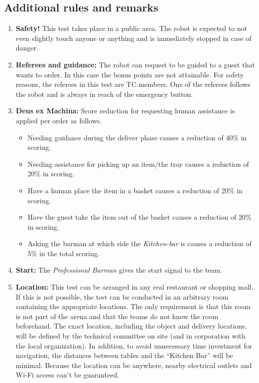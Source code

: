 \subsection{Additional rules and remarks}
\begin{enumerate}[nosep]
	\item \textbf{Safety!} This test takes place in a public area. The robot is expected to not even slightly touch anyone or anything and is immediately stopped in case of danger.

	\item \textbf{Referees and guidance:} The robot can request to be guided to a guest that wants to order. In this case the bonus points are not attainable. For safety reasons, the referees in this test are TC members. One of the referees follows the robot and is always in reach of the emergency button.

    \item \textbf{Deus ex Machina:} Score reduction for requesting human assistance is applied per order as follows.
        \begin{itemize}[nosep]
          \item Needing guidance during the deliver phase causes a reduction of 40\% in scoring.
          \item Needing assistance for picking up an item/the tray causes a reduction of 20\% in scoring.
          \item Have a human place the item in a basket causes a reduction of 20\% in scoring.
          \item Have the guest take the item out of the basket causes a reduction of 20\% in scoring.
          \item Asking the barman at which side the \textit{Kitchen-bar} is causes a reduction of 5\% in the total scoring.
        \end{itemize}

	\item \textbf{Start:} The \textit{Professional Barman} gives the start signal to the team.

	\item \textbf{Location:} This test can be arranged in any real restaurant or shopping mall. If this is not possible, the test can be conducted in an arbitrary room containing the appropriate locations. The only requirement is that this room is not part of the arena and that the teams do not know the room beforehand.
	  The exact location, including the object and delivery locations, will be defined by the technical committee on site (and in corporation with the local organization). In addition, to avoid unnecessary time investment for navigation, the distances between tables and the \enquote{Kitchen Bar} will be minimal. Because the location can be anywhere, nearby electrical outlets and Wi-Fi access can't be guaranteed.


\end{enumerate}
